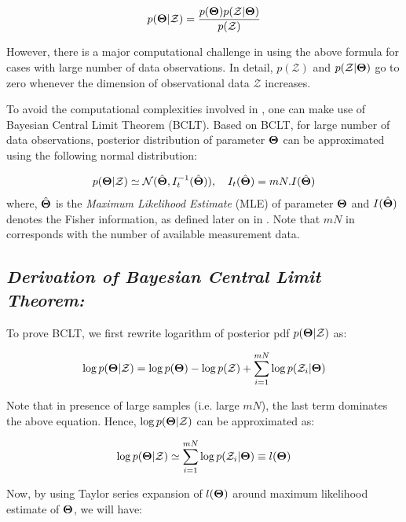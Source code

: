 \documentclass[]{article}
\begin{document}
\begin{equation}\label{bayes}
p(\boldsymbol{\Theta}|\mathcal{Z})=\frac{p(\boldsymbol{\Theta})p(\mathcal{Z}|\boldsymbol{\Theta})}{p(\mathcal{Z})}
\end{equation}

However, there is a major computational challenge in using the above formula for cases with large number of data observations. In detail, $p(\mathcal{Z})$ and $p(\mathcal{Z}|\boldsymbol{\Theta})$ go to zero whenever the dimension of observational data $\mathcal{Z}$ increases. 

To avoid the computational complexities involved in , one can make use of Bayesian Central Limit Theorem (BCLT). Based on BCLT, for large number of data observations, posterior distribution of parameter $\boldsymbol{\Theta}$ can be approximated using the following normal distribution:

\begin{eqnarray}\label{bct}
p(\boldsymbol{\Theta}|\mathcal{Z})\simeq \mathcal{N}(\hat{\boldsymbol{\Theta}},I_t^{-1}(\hat{\boldsymbol{\Theta}})), \quad I_t(\hat{\boldsymbol{\Theta}})=mN.I(\hat{\boldsymbol{\Theta}})
\end{eqnarray}
where, $\hat{\boldsymbol{\Theta}}$ is the \textit{Maximum Likelihood Estimate} (MLE) of parameter $\boldsymbol{\Theta}$ and $I(\hat{\boldsymbol{\Theta}})$ denotes the Fisher information, as defined later on in . Note that $mN$ in  corresponds with the number of available measurement data.

\vspace{0.2in}
\subsection*{\textit{Derivation of Bayesian Central Limit Theorem:}}
\vspace{0.1in}
To prove BCLT, we first rewrite logarithm of posterior pdf $p(\boldsymbol{\Theta}|\mathcal{Z})$ as:

\begin{equation}
\log p(\boldsymbol{\Theta}|\mathcal{Z}) = \log p(\boldsymbol{\Theta})  - \log p(\mathcal{Z}) + \sum_{i=1}^{mN} \log p(\mathcal{Z}_i|\boldsymbol{\Theta})
\end{equation}

Note that in presence of large samples (i.e. large $mN$), the last term dominates the above equation. Hence, $\log p(\boldsymbol{\Theta}|\mathcal{Z})$ can be  approximated as:

\begin{equation}
\log p(\boldsymbol{\Theta}|\mathcal{Z}) \simeq \sum_{i=1}^{mN} \log p(\mathcal{Z}_i|\boldsymbol{\Theta}) \equiv l(\boldsymbol{\Theta})
\end{equation}

Now, by using Taylor series expansion of $l(\boldsymbol{\Theta})$ around maximum likelihood estimate of $\boldsymbol{\Theta}$, we will have:
\end{document}
